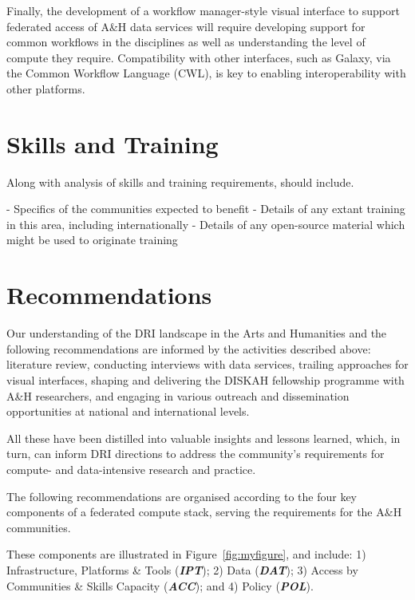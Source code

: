 \documentclass[11pt]{scrartcl}
\begin{document}
Finally, the development of a workflow manager-style visual interface to support federated access of A\&H data services will require developing support for common workflows in the disciplines as well as understanding the level of compute they require. Compatibility with other interfaces, such as Galaxy, via the Common Workflow Language (CWL), is key to enabling interoperability with other platforms.

\section{Skills and Training}
Along with analysis of skills and training requirements, should include.

- Specifics of the communities expected to benefit
- Details of any extant training in this area, including internationally
- Details of any open-source material which might be used to originate training


\section{Recommendations}
Our understanding of the DRI landscape in the Arts and Humanities and the following recommendations are informed by the activities described above: literature review, conducting interviews with data services, trailing approaches for visual interfaces, shaping and delivering the DISKAH fellowship programme with A\&H researchers, and engaging in various outreach and dissemination opportunities at national and international levels. 

All these have been distilled into valuable insights and lessons learned, which, in turn, can inform DRI directions to address the community's requirements for compute- and data-intensive research and practice. 

The following recommendations are organised according to the four key components of a federated compute stack, serving the requirements for the A\&H communities. 

These components are illustrated in Figure~\ref{fig:myfigure}, and include: 1) Infrastructure, Platforms \& Tools (\textit{\textbf{IPT}}); 2) Data (\textit{\textbf{DAT}}); 3) Access by Communities \& Skills Capacity (\textit{\textbf{ACC}}); and 4) Policy (\textit{\textbf{POL}}). 
\end{document}
